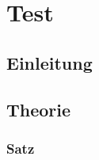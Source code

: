 \documentclass[10pt]{report}
\begin{document}
\chapter{Test}

\section{Einleitung}
\blindtext

\newpage

\section{Theorie}
\blindtext
\subsection{Satz}
\blindtext

\blindtext

\blindtext

\blindtext
\end{document}
